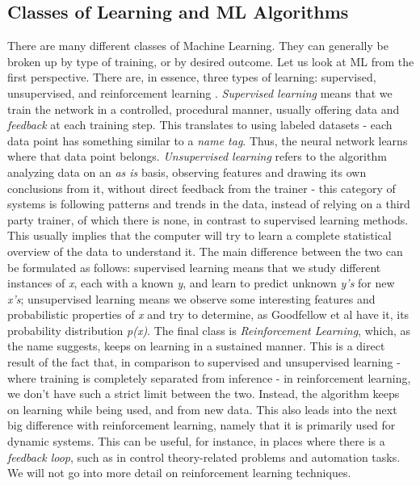 \subsection{Classes of Learning and ML Algorithms}
There are many different classes of Machine Learning. They can generally be broken up by type of training, or by desired outcome. Let us look at ML from the first perspective. There are, in essence, three types of learning: supervised, unsupervised, and reinforcement learning \cite{DBLP:journals/corr/cs-AI-9605103}. \textit{Supervised learning} means that we train the network in a controlled, procedural manner, usually offering data and \textit{feedback} at each training step. This translates to using labeled datasets - each data point has something similar to a \textit{name tag}. Thus, the neural network learns where that data point belongs. \textit{Unsupervised learning} refers to the algorithm analyzing data on an \textit{as is} basis, observing features and drawing its own conclusions from it, without direct feedback from the trainer - this category of systems is following patterns and trends in the data, instead of relying on a third party trainer, of which there is none, in contrast to supervised learning methods. This usually implies that the computer will try to learn a complete statistical overview of the data to understand it. The main difference between the two can be formulated as follows: supervised learning means that we study different instances of \textit{x}, each with a known \textit{y}, and learn to predict unknown \textit{y's} for new \textit{x's}; unsupervised learning means we observe some interesting features and probabilistic properties of \textit{x} and try to determine, as Goodfellow et al have it, its probability distribution \textit{p(x)}. The final class is \textit{Reinforcement Learning}, which, as the name suggests, keeps on learning in a sustained manner. This is a direct result of the fact that, in comparison to supervised and unsupervised learning - where training is completely separated from inference - in reinforcement learning, we don't have such a strict limit between the two. Instead, the algorithm keeps on learning while being used, and from new data. This also leads into the next big difference with reinforcement learning, namely that it is primarily used for dynamic systems. This can be useful, for instance, in places where there is a \textit{feedback loop}, such as in control theory-related problems and automation tasks. We will not go into more detail on reinforcement learning techniques. \par
